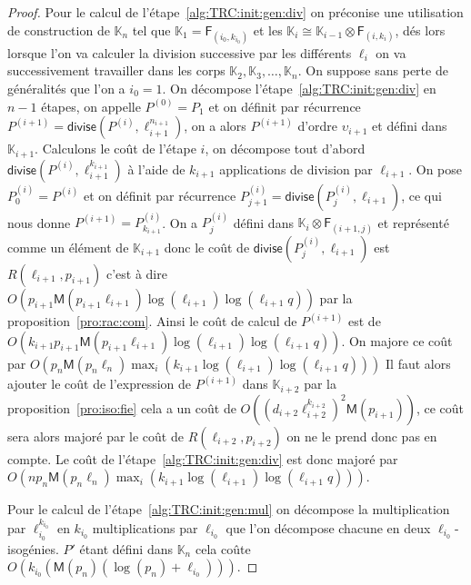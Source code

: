\documentclass[10pt,a4paper]{book}
\theoremstyle{plain}
\theoremstyle{definition}
\theoremstyle{definition}
\theoremstyle{definition}
\theoremstyle{definition}
\theoremstyle{remark}
\theoremstyle{remark}
\theoremstyle{definition}
\begin{document}
\begin{proof}
Pour le calcul de l'étape~\ref{alg:TRC:init:gen:div} on préconise une 
utilisation de construction de $\mathbb{K}_n$ tel que $\mathbb{K}_1=
\mathsf{F}_{(i_0,k_{i_0})}$ et les 
$\mathbb{K}_i \cong \mathbb{K}_{i-1} \otimes \mathsf{F}_{(i,k_i)}$, dés lors lorsque 
l'on va calculer la division successive par les différents $\ell_i$ on va 
successivement travailler dans les corps 
$\mathbb{K}_2, \mathbb{K}_3, \dots, \mathbb{K}_n$. On suppose sans perte 
de généralités que l'on a $i_0=1$. On décompose 
l'étape~\ref{alg:TRC:init:gen:div} en $n-1$ 
étapes, on appelle $P^{(0)}=P_{1}$ et on définit par récurrence 
$P^{(i+1)}=\mathsf{divise}(P^{(i)},\ell_{i+1}^{n_{i+1}})$, on a alors 
$P^{(i+1)}$ d'ordre $\upsilon_{i+1}$ et défini dans $\mathbb{K}_{i+1}$. 
Calculons le coût de l'étape $i$, on décompose tout d'abord 
$\mathsf{divise}(P^{(i)},\ell_{i+1}^{k_{i+1}})$ à l'aide de $k_{i+1}$ 
applications de division par $\ell_{i+1}$. On pose $P^{(i)}_0=P^{(i)}$ et on 
définit par récurrence $P^{(i)}_{j+1}=\mathsf{divise}(P^{(i)}_{j},\ell_{i+1})$,
ce qui nous donne $P^{(i+1)}=P^{(i)}_{k_{i+1}}$. On a $P^{(i)}_{j}$ défini dans 
 $\mathbb{K}_i\otimes \mathsf{F}_{(i+1,j)}$ et représenté comme un élément de 
 $\mathbb{K}_{i+1}$ donc le coût de  $\mathsf{divise}(P^{(i)}_{j},\ell_{i+1})$ 
 est $R(\ell_{i+1},p_{i+1})$ c'est à dire 
 $O(p_{i+1} \mathsf{M}(p_{i+1}  \ell_{i+1})\log(\ell_{i+1})\log(\ell_{i+1}q))$
 par la proposition~\ref{pro:rac:com}. Ainsi le coût de calcul de $P^{(i+1)}$ 
 est de 
 $O(k_{i+1}p_{i+1} \mathsf{M}(p_{i+1}  \ell_{i+1})\log(\ell_{i+1})\log(\ell_{i+1}q))$.
 On majore ce coût par $O(p_{n}\mathsf{M}(p_{n}\ell_{n})\max_i(k_{i+1}\log(\ell_{i+1})\log(\ell_{i+1}q)))$
 Il faut alors ajouter le coût de l'expression de $P^{(i+1)}$ dans 
 $\mathbb{K}_{i+2}$ par la proposition~\ref{pro:iso:fie}
 cela a un coût de $O((d_{i+2}\ell_{i+2}^{k_{i+2}})^2\mathsf{M}(p_{i+1}))$,
 ce coût sera alors majoré par le coût de $R(\ell_{i+2},p_{i+2})$ on ne le 
 prend donc pas en compte. 
 Le coût de l'étape~\ref{alg:TRC:init:gen:div} est donc majoré par 
 $O(n p_{n}\mathsf{M}(p_{n}\ell_{n})\max_i(k_{i+1}\log(\ell_{i+1})\log(\ell_{i+1}q)))$. 

Pour le calcul de l'étape~\ref{alg:TRC:init:gen:mul} on décompose la 
multiplication par $\ell_{i_0}^{k_{i_0}}$ en $k_{i_0}$ multiplications par 
$\ell_{i_0}$ que l'on décompose chacune en deux $\ell_{i_0}$-isogénies. $P'$ 
étant défini dans $\mathbb{K}_{n}$ cela coûte 
$O(k_{i_0}(\mathsf{M}(p_n)(\log(p_n)+\ell_{i_0})))$.


\end{proof}
\end{document}
